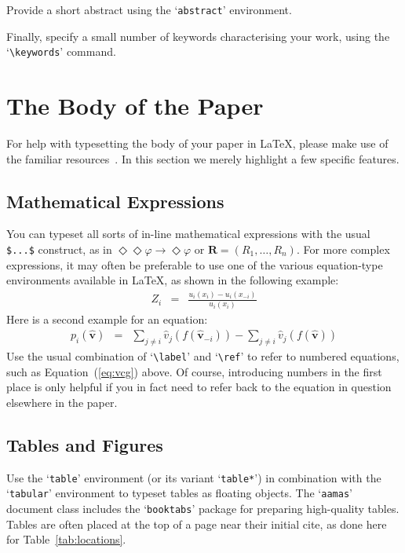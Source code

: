 \documentclass[sigconf,anonymous]{aamas}
\begin{document}
Provide a short abstract using the `\texttt{abstract}' environment.
 
Finally, specify a small number of keywords characterising your work, 
using the `\verb|\keywords|' command. 


\section{The Body of the Paper}

For help with typesetting the body of your paper in \LaTeX\@, please 
make use of the familiar resources~\cite{Lam94}. In this section we 
merely highlight a few specific features. 

\subsection{Mathematical Expressions}

You can typeset all sorts of in-line mathematical expressions 
with the usual \verb|$...$| construct, as in 
$\Diamond\Diamond\varphi \rightarrow \Diamond\varphi$ or 
$\boldsymbol{R} = (R_1,\ldots,R_n)$.
For more complex expressions, it may often be preferable to use one of
the various equation-type environments available in \LaTeX\@, as shown 
in the following example:
%
\begin{eqnarray}
Z_i & = & \frac{u_i(x_i) - u_i(x_{-i})}{u_i(x_i)}
\end{eqnarray}
%
Here is a second example for an equation: 
%
\begin{eqnarray}\label{eq:vcg}
p_i(\boldsymbol{\hat{v}}) & = &
\sum_{j \neq i} \hat{v}_j(f(\boldsymbol{\hat{v}}_{-i})) - 
\sum_{j \neq i} \hat{v}_j(f(\boldsymbol{\hat{v}})) 
\end{eqnarray}
%
Use the usual combination of `\verb|\label|' and `\verb|\ref|' to refer
to numbered equations, such as Equation~(\ref{eq:vcg}) above. Of course,
introducing numbers in the first place is only helpful if you in fact 
need to refer back to the equation in question elsewhere in the paper.


\subsection{Tables and Figures}

Use the `\texttt{table}' environment (or its variant `\texttt{table*}')
in combination with the `\texttt{tabular}' environment to typeset tables
as floating objects. The `\texttt{aamas}' document class includes the 
`\texttt{booktabs}' package for preparing high-quality tables. Tables 
are often placed at the top of a page near their initial cite, as done 
here for Table~\ref{tab:locations}.
\end{document}
